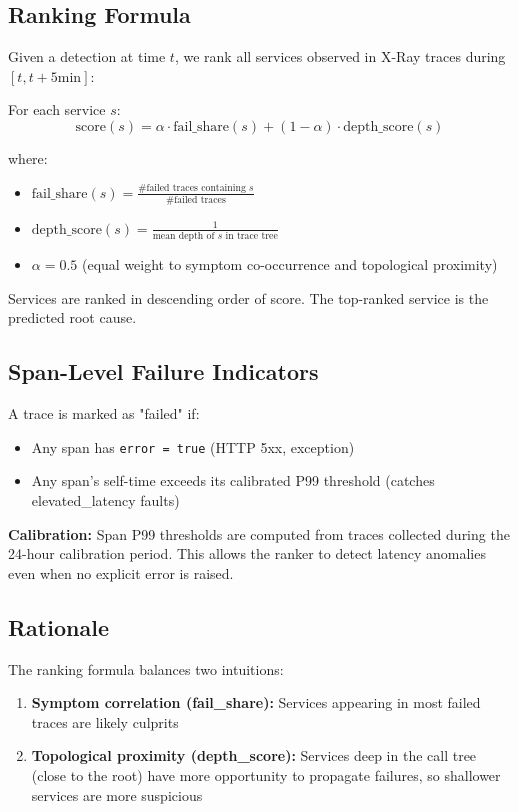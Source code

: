 \subsection{Ranking Formula}

Given a detection at time $t$, we rank all services observed in X-Ray traces during $[t, t+5\text{min}]$:

For each service $s$:
\begin{equation}
\text{score}(s) = \alpha \cdot \text{fail\_share}(s) + (1 - \alpha) \cdot \text{depth\_score}(s)
\end{equation}

where:

\begin{itemize}
    \item $\text{fail\_share}(s) = \frac{\text{\# failed traces containing } s}{\text{\# failed traces}}$
    \item $\text{depth\_score}(s) = \frac{1}{\text{mean depth of } s \text{ in trace tree}}$
    \item $\alpha = 0.5$ (equal weight to symptom co-occurrence and topological proximity)
\end{itemize}

Services are ranked in descending order of score. The top-ranked service is the predicted root cause.

\subsection{Span-Level Failure Indicators}

A trace is marked as "failed" if:
\begin{itemize}
    \item Any span has \texttt{error = true} (HTTP 5xx, exception)
    \item Any span's self-time exceeds its calibrated P99 threshold (catches elevated\_latency faults)
\end{itemize}

\textbf{Calibration:} Span P99 thresholds are computed from traces collected during the 24-hour calibration period. This allows the ranker to detect latency anomalies even when no explicit error is raised.

\subsection{Rationale}

The ranking formula balances two intuitions:
\begin{enumerate}
    \item \textbf{Symptom correlation (fail\_share):} Services appearing in most failed traces are likely culprits
    \item \textbf{Topological proximity (depth\_score):} Services deep in the call tree (close to the root) have more opportunity to propagate failures, so shallower services are more suspicious
\end{enumerate}


